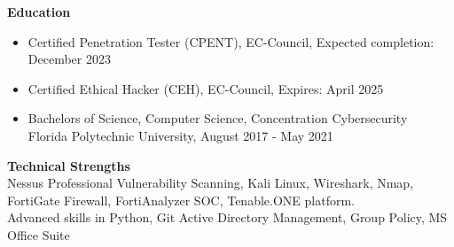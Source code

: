 \documentclass[12pt,a4paper]{article}
\begin{document}
    
    


\textbf{Education}
\begin{itemize}
    \item Certified Penetration Tester (CPENT), EC-Council, Expected completion: December 2023
    \item Certified Ethical Hacker (CEH), EC-Council, Expires: April 2025
    \item Bachelors of Science, Computer Science, Concentration Cybersecurity\\Florida Polytechnic University, August 2017 - May 2021
\end{itemize}


\textbf{Technical Strengths}\\
Nessus Professional Vulnerability Scanning, Kali Linux, Wireshark, Nmap, FortiGate Firewall, FortiAnalyzer SOC, Tenable.ONE platform.\\
Advanced skills in Python, Git
Active Directory Management, Group Policy, MS Office Suite\\
\end{document}
